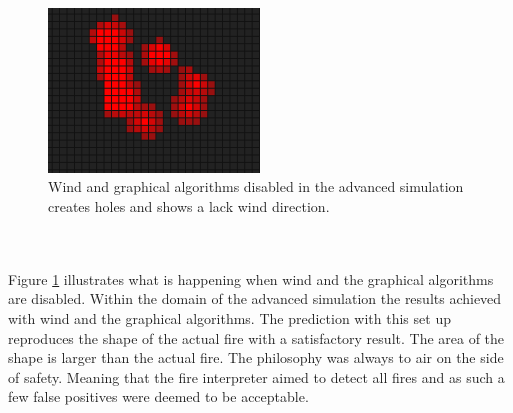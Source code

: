 \begin{figure}[here]
  \centering
      \includegraphics[width=0.5\textwidth]{discussion/graphics/advanced-without-wind-and-bresenham.png}
  \caption{Wind and graphical algorithms disabled in the advanced simulation creates holes and shows a lack wind direction.}
  \label{fig:advanced-without-wind-and-bresenham}
\end{figure}
\\\\
Figure \ref{fig:advanced-without-wind-and-bresenham} illustrates what is happening when wind and the graphical algorithms are disabled. Within the domain of the advanced simulation the results achieved with wind and the graphical algorithms. The prediction with this set up reproduces the shape of the actual fire with a satisfactory result. The area of the shape is larger than the actual fire. The philosophy was always to air on the side of safety. Meaning that the fire interpreter aimed to detect all fires and as such a few false positives were deemed to be acceptable.